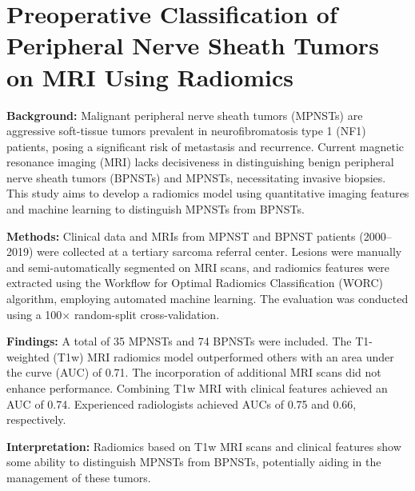 
%	
%	
\chapter[Preoperative Classification of Peripheral Nerve Sheath Tumors on MRI Using Radiomics][Radiomics for PNST]{Preoperative Classification of Peripheral Nerve Sheath Tumors on MRI Using Radiomics}\label{chap: chapter02}

\begin{ChapterAbstract}
	
	\textbf{Background:} Malignant peripheral nerve sheath tumors (MPNSTs) are aggressive soft-tissue tumors prevalent in neurofibromatosis type 1 (NF1) patients, posing a significant risk of metastasis and recurrence.
	Current magnetic resonance imaging (MRI) lacks decisiveness in distinguishing benign peripheral nerve sheath tumors (BPNSTs) and MPNSTs, necessitating invasive biopsies.
	This study aims to develop a radiomics model using quantitative imaging features and machine learning to distinguish MPNSTs from BPNSTs.

	\textbf{Methods:} Clinical data and MRIs from MPNST and BPNST patients (2000--2019) were collected at a tertiary sarcoma referral center.
	Lesions were manually and semi-automatically segmented on MRI scans, and radiomics features were extracted using the Workflow for Optimal Radiomics Classification (WORC) algorithm, employing automated machine learning.
	The evaluation was conducted using a 100$\times$ random-split cross-validation.

	\textbf{Findings:} A total of 35 MPNSTs and 74 BPNSTs were included.
	The T1-weighted (T1w) MRI radiomics model outperformed others with an area under the curve (AUC) of 0.71.
	The incorporation of additional MRI scans did not enhance performance.
	Combining T1w MRI with clinical features achieved an AUC of 0.74.
	Experienced radiologists achieved AUCs of 0.75 and 0.66, respectively.

	\textbf{Interpretation:} Radiomics based on T1w MRI scans and clinical features show some ability to distinguish MPNSTs from BPNSTs, potentially aiding in the management of these tumors.
\end{ChapterAbstract}

